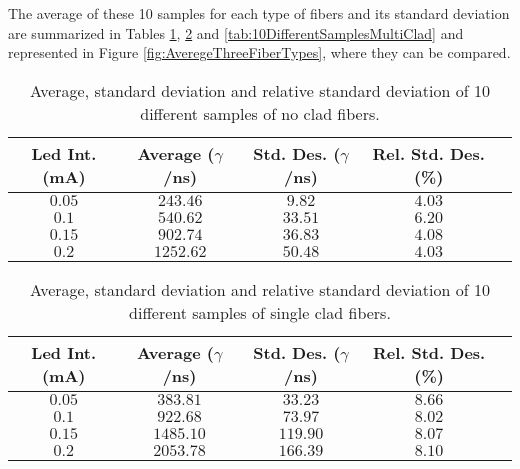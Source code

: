 The average of these 10 samples for each type of fibers and its standard deviation are summarized in Tables \ref{tab:10DifferentSamplesNoClad}, \ref{tab:10DifferentSamplesSingleClad} and \ref{tab:10DifferentSamplesMultiClad} and represented in Figure \ref{fig:AveregeThreeFiberTypes}, where they can be compared. 

\begin{table}[htbp]
\begin{center}
\begin{tabular}{|c|c|c|c|c|}
\hline
Led Int. (mA) & Average ($\gamma$/ns) & Std. Des. ($\gamma$/ns) & Rel. Std. Des. (\%)\\
\hline \hline \hline
$0.05$ & $243.46$ & $9.82$ & $4.03$ \\ \hline
$0.1$ & $540.62$ & $33.51$ & $6.20$ \\ \hline
$0.15$ & $902.74$ & $36.83$ & $4.08$ \\ \hline
$0.2$ & $1252.62$ & $50.48$ & $4.03$ \\ \hline
\end{tabular}
\caption{Average, standard deviation and relative standard deviation of 10 different samples of no clad fibers.}
\label{tab:10DifferentSamplesNoClad}
\end{center}
\end{table}

\begin{table}[htbp]
\begin{center}
\begin{tabular}{|c|c|c|c|c|}
\hline
Led Int. (mA) & Average ($\gamma$/ns) & Std. Des. ($\gamma$/ns) & Rel. Std. Des. (\%)\\
\hline \hline \hline
$0.05$ & $383.81$ & $33.23$ & $8.66$ \\ \hline
$0.1$ & $922.68$ & $73.97$ & $8.02$ \\ \hline
$0.15$ & $1485.10$ & $119.90$ & $8.07$ \\ \hline
$0.2$ & $2053.78$ & $166.39$ & $8.10$ \\ \hline
\end{tabular}
\caption{Average, standard deviation and relative standard deviation of 10 different samples of single clad fibers.}
\label{tab:10DifferentSamplesSingleClad}
\end{center}
\end{table}

